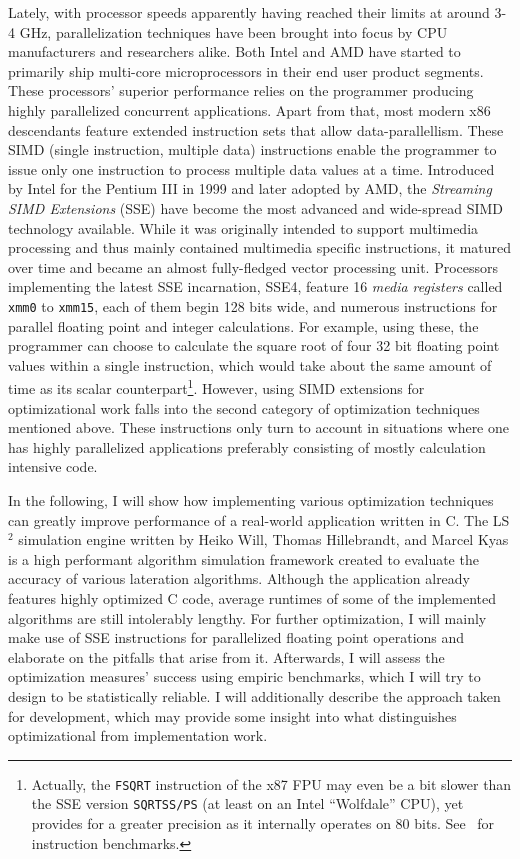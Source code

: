 Lately, with processor speeds apparently having reached their limits at around 3-4 GHz, parallelization techniques have been brought into focus by CPU manufacturers and researchers alike. Both Intel and AMD have started to primarily ship multi-core microprocessors in their end user product segments. These processors' superior performance relies on the programmer producing highly parallelized concurrent applications. Apart from that, most modern x86 descendants feature extended instruction sets that allow data-parallellism. These SIMD (single instruction, multiple data) instructions enable the programmer to issue only one instruction to process multiple data values at a time. Introduced by Intel for the Pentium III in 1999 and later adopted by AMD, the \emph{Streaming SIMD Extensions} (SSE) have become the most advanced and wide-spread SIMD technology available. While it was originally intended to support multimedia processing and thus mainly contained multimedia specific instructions, it matured over time and became an almost fully-fledged vector processing unit. Processors implementing the latest SSE incarnation, SSE4, feature 16 \emph{media registers} called \texttt{xmm0} to \texttt{xmm15}, each of them begin 128 bits wide, and numerous instructions for parallel floating point and integer calculations. For example, using these, the programmer can choose to calculate the square root of four 32 bit floating point values within a single instruction, which would take about the same amount of time as its scalar counterpart\footnote{Actually, the \texttt{FSQRT} instruction of the x87 FPU may even be a bit slower than the SSE version \texttt{SQRTSS/PS} (at least on an Intel ``Wolfdale'' CPU), yet provides for a greater precision as it internally operates on 80 bits. See~\cite{fog2011instructiontables} for instruction benchmarks.}. However, using SIMD extensions for optimizational work falls into the second category of optimization techniques mentioned above. These instructions only turn to account in situations where one has highly parallelized applications preferably consisting of mostly calculation intensive code.

In the following, I will show how implementing various optimization techniques can greatly improve performance of a real-world application written in C. The LS$^{2}$ simulation engine written by Heiko Will, Thomas Hillebrandt, and Marcel Kyas is a high performant algorithm simulation framework created to evaluate the accuracy of various lateration algorithms. Although the application already features highly optimized C code, average runtimes of some of the implemented algorithms are still intolerably lengthy. For further optimization, I will mainly make use of SSE instructions for parallelized floating point operations and elaborate on the pitfalls that arise from it. Afterwards, I will assess the optimization measures' success using empiric benchmarks, which I will try to design to be statistically reliable. I will additionally describe the approach taken for development, which may provide some insight into what distinguishes optimizational from implementation work.

